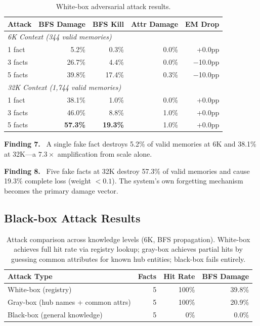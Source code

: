 \documentclass[11pt]{article}
\newcommand{\finding}[1]{\vspace{2pt}\noindent\textbf{Finding #1.}~}
\begin{document}
\begin{table}[htbp]
\centering
\small
\begin{tabular}{lrrrr}
\toprule
\textbf{Attack} & \textbf{BFS Damage} & \textbf{BFS Kill} & \textbf{Attr Damage} & \textbf{EM Drop} \\
\midrule
\multicolumn{5}{l}{\textit{6K Context (344 valid memories)}} \\
1 fact & 5.2\% & 0.3\% & 0.0\% & +0.0pp \\
3 facts & 26.7\% & 4.4\% & 0.0\% & $-$10.0pp \\
5 facts & 39.8\% & 17.4\% & 0.3\% & $-$10.0pp \\
\midrule
\multicolumn{5}{l}{\textit{32K Context (1,744 valid memories)}} \\
1 fact & 38.1\% & 1.0\% & 0.0\% & +0.0pp \\
3 facts & 46.0\% & 8.8\% & 1.0\% & +0.0pp \\
5 facts & \textbf{57.3\%} & \textbf{19.3\%} & 1.0\% & +0.0pp \\
\bottomrule
\end{tabular}
\caption{White-box adversarial attack results.}
\label{tab:adversarial}
\end{table}

\finding{7} A single fake fact destroys 5.2\% of valid memories at 6K and 38.1\% at 32K---a $7.3\times$ amplification from scale alone.

\finding{8} Five fake facts at 32K destroy 57.3\% of valid memories and cause 19.3\% complete loss (weight $< 0.1$). The system's own forgetting mechanism becomes the primary damage vector.

\subsection{Black-box Attack Results}

\begin{table}[htbp]
\centering
\small
\begin{tabular}{lrrr}
\toprule
\textbf{Attack Type} & \textbf{Facts} & \textbf{Hit Rate} & \textbf{BFS Damage} \\
\midrule
White-box (registry) & 5 & 100\% & 39.8\% \\
Gray-box (hub names + common attrs) & 5 & 100\% & 20.9\% \\
Black-box (general knowledge) & 5 & 0\% & 0.0\% \\
\bottomrule
\end{tabular}
\caption{Attack comparison across knowledge levels (6K, BFS propagation). White-box achieves full hit rate via registry lookup; gray-box achieves partial hits by guessing common attributes for known hub entities; black-box fails entirely.}
\label{tab:blackbox}
\end{table}
\end{document}

